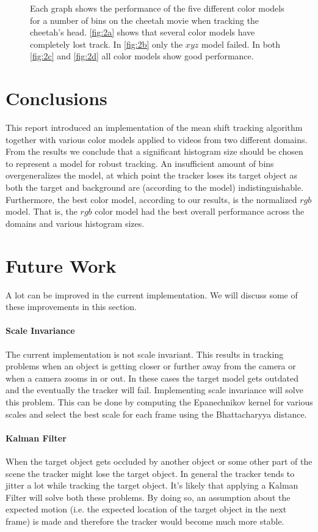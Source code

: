\documentclass[11pt]{article}
\begin{document}
\begin{figure}[!ht]
{\label{fig:2d}
}
\caption{Each graph shows the performance of the five different color models for
a number of bins on the cheetah movie when tracking the cheetah's head.
\ref{fig:2a} shows that several color models have completely lost track. In
\ref{fig:2b} only the $xyz$ model failed. In both \ref{fig:2c} and \ref{fig:2d}
all color models show good performance.}
\label{fig:cheetah}
\end{figure}

\section{Conclusions} \label{sec:conclusion}
This report introduced an implementation of the mean shift tracking algorithm
together with various color models applied to videos from two different domains.
From the results we conclude that a significant histogram size should be chosen
to represent a model for robust tracking. An insufficient amount of bins
overgeneralizes the model, at which point the tracker loses its target object as
both the target and background are (according to the model) indistinguishable.
Furthermore, the best color model, according to our results, is the normalized
$rgb$ model. That is, the $rgb$ color model had the best overall performance
across the domains and various histogram sizes.

\section{Future Work} \label{sec:future}
A lot can be improved in the current implementation. We will discuss some of
these improvements in this section.

\paragraph{Scale Invariance} The current implementation is not scale invariant. This
results in tracking problems when an object is getting closer or further away
from the camera or when a camera zooms in or out. In these cases the target
model gets outdated and the eventually the tracker will fail. Implementing
scale invariance will solve this problem. This can be done by computing the
Epanechnikov kernel for various scales and select the best scale for each
frame using the Bhattacharyya distance.

\paragraph{Kalman Filter} When the target object gets occluded by another object
or some other part of the scene the tracker might lose the target object. In
general the tracker tends to jitter a lot while tracking the target object.
It's likely that applying a Kalman Filter will solve both these problems. By
doing so, an assumption about the expected motion (i.e. the expected location
of the target object in the next frame) is made and therefore the tracker would
become much more stable.
\end{document}
